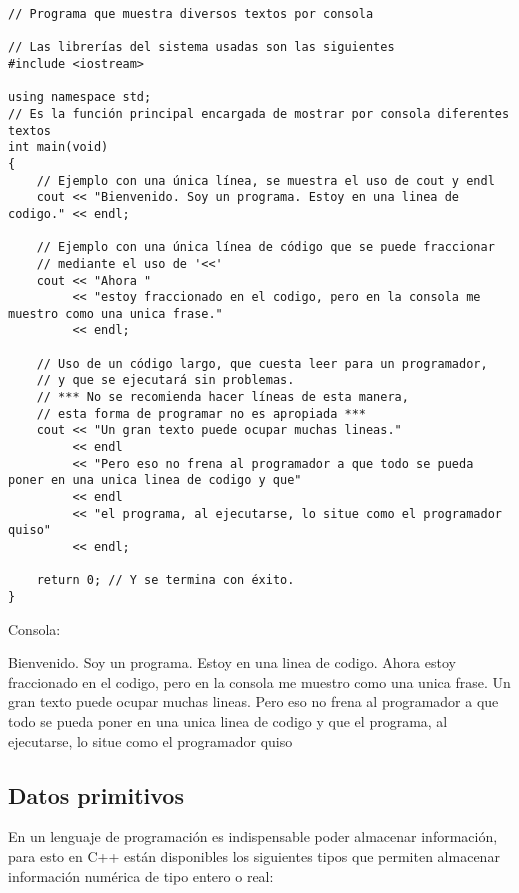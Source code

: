 \begin{lstlisting}[style=Cpp, label=impresión, caption=Impresión]
// Programa que muestra diversos textos por consola

// Las librerías del sistema usadas son las siguientes
#include <iostream>

using namespace std;
// Es la función principal encargada de mostrar por consola diferentes textos
int main(void)
{
    // Ejemplo con una única línea, se muestra el uso de cout y endl
    cout << "Bienvenido. Soy un programa. Estoy en una linea de codigo." << endl;

    // Ejemplo con una única línea de código que se puede fraccionar
    // mediante el uso de '<<'
    cout << "Ahora "
         << "estoy fraccionado en el codigo, pero en la consola me muestro como una unica frase."
         << endl;

    // Uso de un código largo, que cuesta leer para un programador,
    // y que se ejecutará sin problemas.
    // *** No se recomienda hacer líneas de esta manera,
    // esta forma de programar no es apropiada ***
    cout << "Un gran texto puede ocupar muchas lineas."
         << endl
         << "Pero eso no frena al programador a que todo se pueda poner en una unica linea de codigo y que"
         << endl
         << "el programa, al ejecutarse, lo situe como el programador quiso"
         << endl;

    return 0; // Y se termina con éxito.
}
\end{lstlisting}

Consola:

\begin{listing}[style=consola, numbers=none,label=resultado-impresión,caption=Resultado Impresión]
Bienvenido. Soy un programa. Estoy en una linea de codigo.
Ahora estoy fraccionado en el codigo, pero en la consola me muestro como una unica frase.
Un gran texto puede ocupar muchas lineas.
Pero eso no frena al programador a que todo se pueda poner en una unica linea de codigo y que
el programa, al ejecutarse, lo situe como el programador quiso

\end{listing}

\subsection{Datos primitivos}

En un lenguaje de programación es indispensable poder almacenar información, para esto en C++ están disponibles los siguientes tipos que permiten almacenar información numérica de tipo entero o real:

